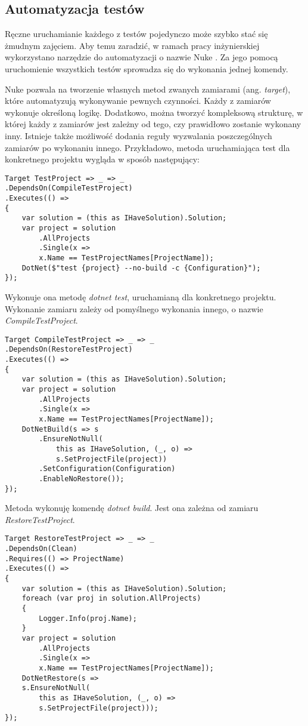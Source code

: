 \subsection{Automatyzacja testów}

Ręczne uruchamianie każdego z testów pojedynczo może szybko stać się żmudnym zajęciem. 
Aby temu zaradzić, w ramach pracy inżynierskiej wykorzystano narzędzie do automatyzacji 
o nazwie Nuke \cite{nuke2022}. 
Za jego pomocą uruchomienie wszystkich testów sprowadza się do wykonania 
jednej komendy. 

Nuke pozwala na tworzenie własnych metod zwanych zamiarami (ang. \textit{target}), które automatyzują 
wykonywanie pewnych czynności. Każdy z zamiarów wykonuje określoną logikę. 
Dodatkowo, można tworzyć kompleksową strukturę, w której każdy z zamiarów jest zależny 
od tego, czy prawidłowo zostanie wykonany inny. Istnieje także możliwość 
dodania reguły wyzwalania poszczególnych zamiarów po wykonaniu innego. 
Przykładowo, metoda uruchamiająca test dla konkretnego projektu wygląda w sposób 
następujący:

\begin{lstlisting}
Target TestProject => _ => _
.DependsOn(CompileTestProject)
.Executes(() =>
{
    var solution = (this as IHaveSolution).Solution;
    var project = solution
        .AllProjects
        .Single(x => 
        x.Name == TestProjectNames[ProjectName]);
    DotNet($"test {project} --no-build -c {Configuration}");
});
\end{lstlisting}

Wykonuje ona metodę \textit{dotnet test}, uruchamianą dla konkretnego projektu. 
Wykonanie zamiaru zależy od pomyślnego wykonania innego, o nazwie \textit{CompileTestProject}.

\begin{lstlisting}
Target CompileTestProject => _ => _
.DependsOn(RestoreTestProject)
.Executes(() =>
{
    var solution = (this as IHaveSolution).Solution;
    var project = solution
        .AllProjects
        .Single(x => 
        x.Name == TestProjectNames[ProjectName]);
    DotNetBuild(s => s
        .EnsureNotNull(
            this as IHaveSolution, (_, o) => 
            s.SetProjectFile(project))
        .SetConfiguration(Configuration)
        .EnableNoRestore());
});
\end{lstlisting}

Metoda wykonuję komendę \textit{dotnet build}. Jest ona 
zależna od zamiaru \textit{RestoreTestProject}.

\begin{lstlisting}
Target RestoreTestProject => _ => _
.DependsOn(Clean)
.Requires(() => ProjectName)
.Executes(() =>
{
    var solution = (this as IHaveSolution).Solution;
    foreach (var proj in solution.AllProjects)
    {
        Logger.Info(proj.Name);
    }
    var project = solution
        .AllProjects
        .Single(x => 
        x.Name == TestProjectNames[ProjectName]);
    DotNetRestore(s => 
    s.EnsureNotNull(
        this as IHaveSolution, (_, o) => 
        s.SetProjectFile(project)));
});
\end{lstlisting}

